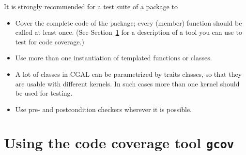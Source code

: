 It is strongly recommended for a test suite of a package to
\begin {itemize}
\item Cover the complete code of the package; every (member) function
      should be called at least once. (See Section~\ref{sec:gcov} for
      a description of a tool you can use to test for code coverage.)
\item Use more than one instantiation of templated functions or classes.
\item A lot of classes in CGAL can be parametrized by traits classes, so 
      that they are usable with different kernels. In such cases more than one
      kernel should be used for testing.
\item Use pre- and postcondition checkers wherever it is possible.
\end {itemize}

\section{Using the code coverage tool \texttt{gcov}}
\label{sec:gcov}

